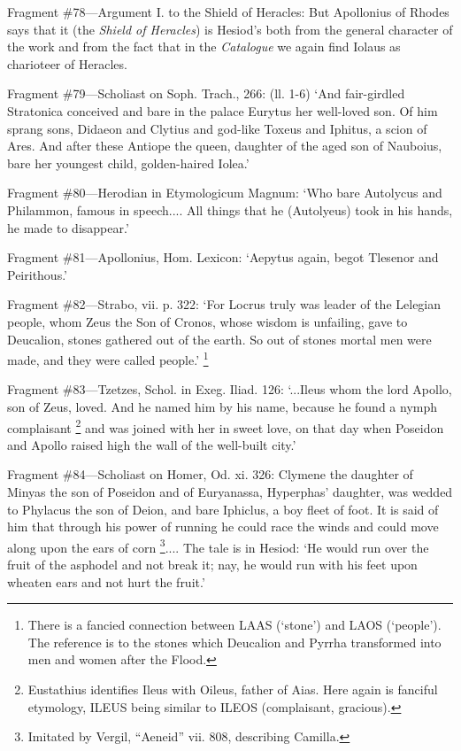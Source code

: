 Fragment \#78—Argument I. to the Shield of Heracles: But Apollonius of
Rhodes says that it (the \emph{Shield of Heracles}) is Hesiod’s
both from the general character of the work and from the fact that in the
\emph{Catalogue} we again find Iolaus as charioteer of Heracles.

Fragment \#79—Scholiast on Soph. Trach., 266: (ll. 1-6) ‘And
fair-girdled Stratonica conceived and bare in the palace Eurytus her well-loved
son. Of him sprang sons, Didaeon and Clytius and god-like Toxeus and Iphitus, a
scion of Ares. And after these Antiope the queen, daughter of the aged son of
Nauboius, bare her youngest child, golden-haired Iolea.’

Fragment \#80—Herodian in Etymologicum Magnum: ‘Who bare Autolycus
and Philammon, famous in speech.... All things that he (Autolyeus) took in his
hands, he made to disappear.’

Fragment \#81—Apollonius, Hom. Lexicon: ‘Aepytus again, begot
Tlesenor and Peirithous.’

Fragment \#82—Strabo, vii. p. 322: ‘For Locrus truly was leader of
the Lelegian people, whom Zeus the Son of Cronos, whose wisdom is unfailing,
gave to Deucalion, stones gathered out of the earth. So out of stones mortal
men were made, and they were called people.’ \footnote{There is a fancied
connection between LAAS (‘stone’) and LAOS (‘people’).
The reference is to the stones which Deucalion and Pyrrha transformed into men
and women after the Flood.}

Fragment \#83—Tzetzes, Schol. in Exeg. Iliad. 126: ‘...Ileus whom
the lord Apollo, son of Zeus, loved. And he named him by his name, because he
found a nymph complaisant \footnote{Eustathius identifies
Ileus with Oileus, father of Aias. Here again is fanciful etymology, ILEUS
being similar to ILEOS (complaisant, gracious).} and was joined with her in sweet
love, on that day when Poseidon and Apollo raised high the wall of the
well-built city.’

Fragment \#84—Scholiast on Homer, Od. xi. 326: Clymene the daughter of
Minyas the son of Poseidon and of Euryanassa, Hyperphas’ daughter, was
wedded to Phylacus the son of Deion, and bare Iphiclus, a boy fleet of foot. It
is said of him that through his power of running he could race the winds and
could move along upon the ears of corn \footnote{Imitated by Vergil,
“Aeneid” vii. 808, describing Camilla.}.... The
tale is in Hesiod: ‘He would run over the fruit of the asphodel and not
break it; nay, he would run with his feet upon wheaten ears and not hurt the
fruit.’

